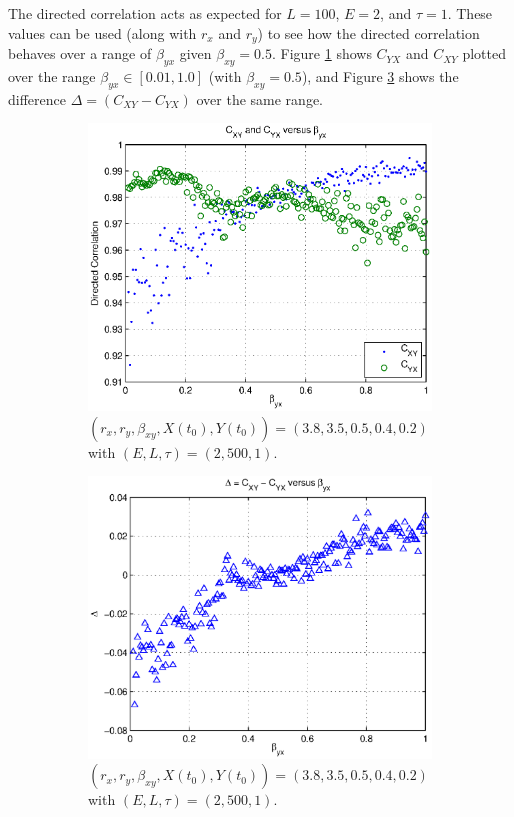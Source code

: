 \documentclass[a4paper,11pt]{article}
\begin{document}
The directed correlation acts as expected for $L=100$, $E=2$, and $\tau=1$.  These values can be used (along with $r_x$ and $r_y$) to see how the directed correlation behaves over a range of $\beta_{yx}$ given $\beta_{xy}=0.5$.  Figure \ref{fig:CxyCyxVByx_raw} shows $C_{YX}$ and $C_{XY}$ plotted over the range $\beta_{yx}\in[0.01,1.0]$ (with $\beta_{xy}=0.5$), and Figure \ref{fig:CxyCyxVByx_diff} shows the difference $\Delta = (C_{XY}-C_{YX})$ over the same range.
\begin{figure}[h!t]
\centering
\begin{subfigure}[b]{0.4\textwidth}
\label{fig:CxyCyxVByx_raw}
\includegraphics[scale=0.55]{CxyCyxVByx_raw.eps}
\caption{$\left(r_x,r_y,\beta_{xy},X(t_0),Y(t_0)\right) = \left(3.8,3.5,0.5,0.4,0.2\right)$ with $\left(E,L,\tau\right)=\left(2,500,1\right)$.}
\end{subfigure}
\begin{subfigure}[b]{0.4\textwidth}
\label{fig:CxyCyxVByx_diff}
\includegraphics[scale=0.55]{CxyCyxVByx_diff.eps}
\caption{$\left(r_x,r_y,\beta_{xy},X(t_0),Y(t_0)\right) = \left(3.8,3.5,0.5,0.4,0.2\right)$ with $\left(E,L,\tau\right)=\left(2,500,1\right)$.}
\end{subfigure}
\caption{}
\end{figure}
\end{document}

